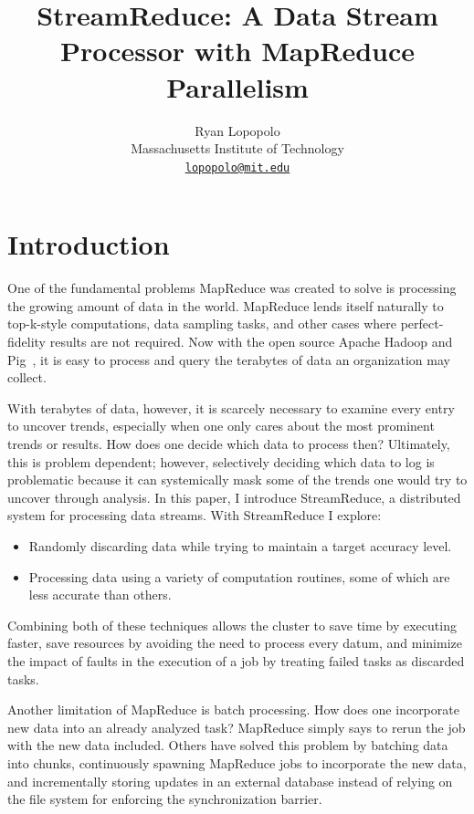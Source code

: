 \documentclass[12pt,twocolumn]{article}
\title{StreamReduce: A Data Stream Processor with MapReduce Parallelism}
\author{Ryan Lopopolo\\
Massachusetts Institute of Technology\\
\href{mailto:lopopolo@mit.edu}{\texttt{lopopolo@mit.edu}}}
\begin{document}
\maketitle

\section{Introduction}
\label{sec:intro}
One of the fundamental problems MapReduce was created to solve is processing
the growing amount of data in the world.
MapReduce lends itself naturally to top-k-style computations,
data sampling tasks, and other cases where perfect-fidelity results are not required.
Now with the open source Apache Hadoop
and Pig~\cite{Olston:2008:PLN:1376616.1376726}, it is easy to process and query
the terabytes of data an organization may collect.

With terabytes of data, however, it is scarcely necessary to examine
every entry to uncover trends, especially when one only cares about the most prominent
trends or results.
How does one decide which data to process then? Ultimately, this is problem dependent;
however, selectively deciding which data to
log is problematic because it can systemically mask some of the trends one would
try to uncover through analysis. In this paper, I introduce StreamReduce, a distributed
system
for processing data streams. With StreamReduce I explore:
\begin{itemize}
  \item
    Randomly discarding data while trying to maintain a target accuracy level.
  \item
    Processing data using a variety of computation routines, some of which are less
    accurate than others.
\end{itemize}
Combining both of these techniques allows the cluster to save time by executing faster,
save resources by avoiding the need to process every datum, and minimize the impact of
faults
in the execution of a job by treating failed tasks as discarded tasks.

Another limitation of MapReduce is batch processing. How does one
incorporate new data into an already analyzed task? MapReduce simply says to rerun
the job with the new data included. Others have solved this problem by batching data
into chunks, continuously spawning MapReduce jobs to incorporate the new data,
and incrementally storing updates in an external database instead of relying on
the file system for enforcing the synchronization barrier.
\end{document}
